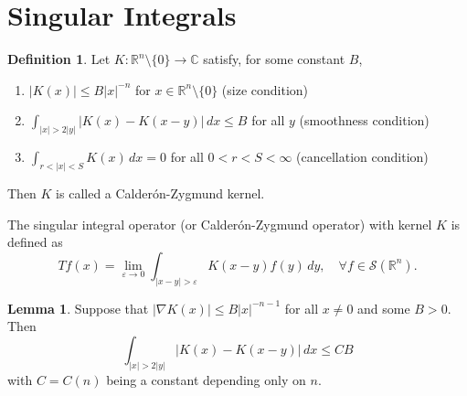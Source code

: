 \documentclass[12pt,openany]{book}
\theoremstyle{definition}
\newtheorem{lemma}[theorem]{Lemma}
\newtheorem{definition}[theorem]{Definition}
\begin{document}
\section{Singular Integrals}
\begin{definition}
    Let $K: \mathbb{R}^n \setminus \{0\} \rightarrow \mathbb{C}$ satisfy, for some constant $B$,
\begin{enumerate}
    \item $|K(x)| \leqslant B|x|^{-n}$ for $x \in \mathbb{R}^n \setminus \{0\}$ \quad (size condition)
    \item $\int_{|x|>2|y|}|K(x) - K(x-y)| \, dx \leq B$ for all $y$ \quad (smoothness condition)
    \item $\int_{r<|x|<S} K(x) \, dx = 0$ for all $0 < r < S < \infty$ \quad (cancellation condition)
\end{enumerate}
Then $K$ is called a Calder\'{o}n-Zygmund kernel.

The singular integral operator (or Calder\'{o}n-Zygmund operator) with kernel $K$ is defined as
\[
Tf(x) = \lim_{\varepsilon \rightarrow 0} \int_{|x-y|>\varepsilon} K(x-y) f(y) \, dy, \quad \forall f \in \mathcal{S}(\mathbb{R}^n).
\]
\end{definition}
\begin{lemma}
    Suppose that $|\nabla K(x)| \leq B|x|^{-n-1}$ for all $x \neq 0$ and some $B > 0$. Then
\[
\int_{|x|>2|y|}|K(x) - K(x-y)| \, dx \leq CB
\]
with $C = C(n)$ being a constant depending only on $n$.
\end{lemma}
\end{document}
